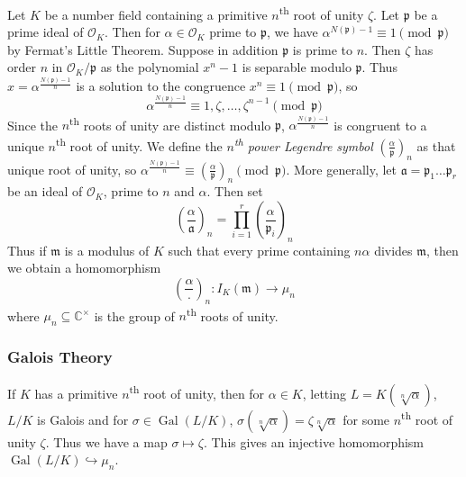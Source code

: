 \documentclass[11pt]{article}
\theoremstyle{definition}
\theoremstyle{plain}
\theoremstyle{remark}
\DeclareMathOperator{\Gal}{Gal}
\newcommand{\CC}{\mathbb{C}}
\newcommand{\cO}{\mathcal{O}}
\newcommand{\fa}{\mathfrak{a}}
\newcommand{\fp}{\mathfrak{p}}
\newcommand{\fm}{\mathfrak{m}}
\newcommand{\leg}[2]{\left(\frac{#1}{#2}\right)}
\begin{document}
Let $K$ be a number field containing a primitive $n$\textsuperscript{th} root of unity $\zeta$. Let $\fp$ be a prime ideal of $\cO_K$. Then for $\alpha \in \cO_K$ prime to $\fp$, we have $\alpha^{N(\fp) - 1} \equiv 1 \pmod{\fp}$ by Fermat's Little Theorem. Suppose in addition $\fp$ is prime to $n$. Then $\zeta$ has order $n$ in $\cO_K / \fp$ {\color{blue} as the polynomial $x^n - 1$ is separable modulo $\fp$}. Thus $x = \alpha^{\frac{N(\fp)-1}{n}}$ is a solution to the congruence $x^n \equiv 1 \pmod{\fp}$, so
\begin{equation*}
    \alpha^{\frac{N(\fp)-1}{n}} \equiv 1, \zeta, \ldots, \zeta^{n-1} \pmod{\fp}
\end{equation*}
Since the $n$\textsuperscript{th} roots of unity are distinct modulo $\fp$, $\alpha^{\frac{N(\fp)-1}{n}}$ is congruent to a unique $n$\textsuperscript{th} root of unity. We define the \emph{$n$\textsuperscript{th} power Legendre symbol} $\leg{\alpha}{\fp}_n$ as that unique root of unity, so $\alpha^{\frac{N(\fp)-1}{n}} \equiv \leg{\alpha}{\fp}_n \pmod{\fp}$. More generally, let $\fa = \fp_1 \ldots \fp_r$ be an ideal of $\cO_K$, prime to $n$ and $\alpha$. Then set
\begin{equation*}
    \leg{\alpha}{\fa}_n = \prod_{i=1}^r \leg{\alpha}{\fp_i}_n
\end{equation*}
Thus if $\fm$ is a modulus of $K$ such that every prime containing $n\alpha$ divides $\fm$, then we obtain a homomorphism
\begin{equation*}
    \leg{\alpha}{\cdot}_n : I_K(\fm) \to \mu_n
\end{equation*}
where $\mu_n \subseteq \CC^\times$ is the group of $n$\textsuperscript{th} roots of unity.

\subsubsection*{Galois Theory}
If $K$ has a primitive $n$\textsuperscript{th} root of unity, then for $\alpha \in K$, letting $L = K(\sqrt[n]{\alpha})$, $L/K$ is Galois and for $\sigma \in \Gal(L/K)$, $\sigma(\sqrt[n]{\alpha}) = \zeta \sqrt[n]{\alpha}$ for some $n$\textsuperscript{th} root of unity $\zeta$. Thus we have a map $\sigma \mapsto \zeta$. This gives an injective homomorphism $\Gal(L/K) \hookrightarrow \mu_n$.
\end{document}
